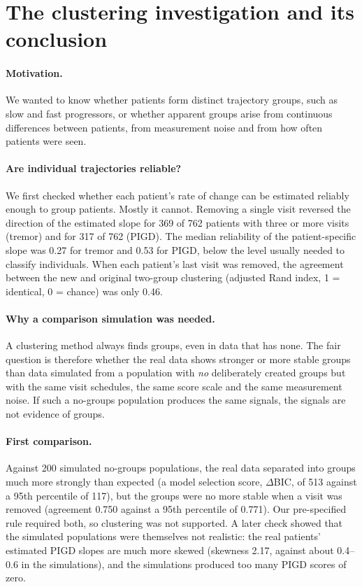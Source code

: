 \documentclass[11pt,a4paper]{article}
\begin{document}
\section{The clustering investigation and its conclusion}
\label{sec:clustering}

\paragraph{Motivation.} We wanted to know whether patients form distinct
trajectory groups, such as slow and fast progressors, or whether apparent groups
arise from continuous differences between patients, from measurement noise and
from how often patients were seen.

\paragraph{Are individual trajectories reliable?} We first checked whether each
patient's rate of change can be estimated reliably enough to group patients.
Mostly it cannot. Removing a single visit reversed the direction of the
estimated slope for 369 of 762 patients with three or more visits (tremor) and
for 317 of 762 (PIGD). The median reliability of the patient-specific slope was
0.27 for tremor and 0.53 for PIGD, below the level usually needed to classify
individuals. When each patient's last visit was removed, the agreement between
the new and original two-group clustering (adjusted Rand index, 1 = identical,
0 = chance) was only 0.46.

\paragraph{Why a comparison simulation was needed.} A clustering method always
finds groups, even in data that has none. The fair question is therefore
whether the real data shows stronger or more stable groups than data simulated
from a population with \emph{no} deliberately created groups but with the same
visit schedules, the same score scale and the same measurement noise. If such a
no-groups population produces the same signals, the signals are not evidence
of groups.

\paragraph{First comparison.} Against 200 simulated no-groups populations, the
real data separated into groups much more strongly than expected (a model
selection score, $\Delta$BIC, of 513 against a 95th percentile of 117), but
the groups were no more stable when a visit was removed (agreement 0.750
against a 95th percentile of 0.771). Our pre-specified rule required both, so
clustering was not supported. A later check showed that the simulated
populations were themselves not realistic: the real patients' estimated PIGD
slopes are much more skewed (skewness 2.17, against about 0.4--0.6 in the
simulations), and the simulations produced too many PIGD scores of zero.
\end{document}

